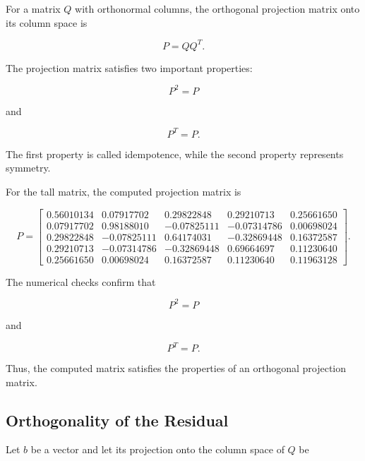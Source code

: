 \documentclass[12pt,a4paper]{article}
\numberwithin{equation}{section}
\begin{document}
For a matrix $Q$ with orthonormal columns,
the orthogonal projection matrix onto its column
space is

\begin{equation}
\boxed{P=QQ^T}.
\end{equation}

The projection matrix satisfies two important
properties:

\begin{equation}
\boxed{P^2=P}
\end{equation}

and

\begin{equation}
\boxed{P^T=P}.
\end{equation}

The first property is called idempotence, while
the second property represents symmetry.

For the tall matrix, the computed projection matrix is

\begin{equation}
P=
\begin{bmatrix}
0.56010134&0.07917702&0.29822848&0.29210713&0.25661650\\
0.07917702&0.98188010&-0.07825111&-0.07314786&0.00698024\\
0.29822848&-0.07825111&0.64174031&-0.32869448&0.16372587\\
0.29210713&-0.07314786&-0.32869448&0.69664697&0.11230640\\
0.25661650&0.00698024&0.16372587&0.11230640&0.11963128
\end{bmatrix}.
\end{equation}

The numerical checks confirm that

\begin{equation}
P^2=P
\end{equation}

and

\begin{equation}
P^T=P.
\end{equation}

Thus, the computed matrix satisfies the
properties of an orthogonal projection matrix.

\subsection{Orthogonality of the Residual}

Let $b$ be a vector and let its projection onto
the column space of $Q$ be
\end{document}
